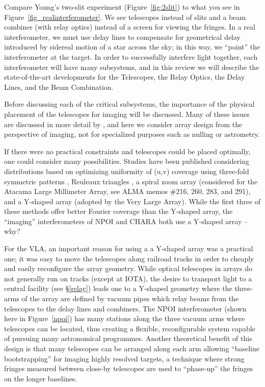 \documentclass[12pt]{iopart}
\begin{document}
Compare Young's two-slit experiment (Figure~\ref{fig:2slit}) to what
you see in Figure~\ref{fig_realinterferometer}.  We see telescopes
instead of slits and a beam combiner (with relay optics) instead of a
screen for viewing the fringes.  In a real interferometer, we must use
delay lines to compensate for geometrical delay introduced by sidereal
motion of a star across the sky; in this way, we ``point'' the
interferometer at the target.
In order to successfully interfere light together, each interferometer will
have many subsystems, and in this review we will describe the
state-of-the-art developments for the
Telescopes, the Relay Optics, the Delay Lines,
and the Beam Combination.

\label{arraydesign}
Before discussing each of the critical subsystems, the importance of
the physical placement of the telescopes for imaging will be
discussed.  Many of these issues are discussed in more detail by
\citet{mozurk2000}, and here we consider array design from the
perspective of imaging, not for specialized purposes such as nulling
or astrometry.

If there were no practical constraints and telescopes could be placed
optimally, one could consider many possibilities.  Studies have been
published considering distributions based on optimizing uniformity of
(u,v) coverage using three-fold symmetric patterns \citep[used in Keck
aperture masking,][]{golay71}, Reuleaux triangles \citep[used for the
Sub-Millimeter Array,][]{keto1997}, a spiral zoom array (considered
for the Atacama Large Millimeter Array, see ALMA memos \#216, 260,
283, and 291), and a Y-shaped array (adopted by the Very Large Array).
While the first three of these methods offer better Fourier coverage
than the Y-shaped array, the ``imaging'' interferometers of NPOI and
CHARA both use a Y-shaped array -- why?

For the VLA, an important reason for using a a Y-shaped array was a
practical one; it was easy to move the telescopes along railroad
tracks in order to cheaply and easily reconfigure the array geometry.
While optical telescopes in arrays do not generally run on tracks
(except at IOTA), the desire to transport light to a central facility
(see \S\ref{relay}) leads one to a Y-shaped geometry where the
three-arms of the array are defined by vacuum pipes which relay beams
from the telescopes to the delay lines and combiners.  The NPOI
interferometer (shown here in Figure~\ref{npoi}) has many stations
along the three vacuum arms where telescopes can be located, thus
creating a flexible, reconfigurable system capable of pursuing many
astronomical programmes. Another theoretical benefit of this design is
that many telescopes can be arranged along each arm allowing
``baseline bootstrapping'' for imaging highly resolved targets, a
technique where strong fringes measured between close-by telescopes
are used to ``phase-up'' the fringes on the longer baselines.
\end{document}
